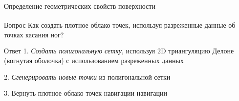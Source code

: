 \documentclass[aspectratio=169,xcolor=table]{beamer}
\begin{document}

\begin{frame}[t]{Определение геометрических свойств поверхности}
    \framesubtitle{}
    {\large\begin{block}{Вопрос}
        Как создать плотное облако точек, используя разреженные данные об точках касания ног?
        \end{block}}
    {\large\begin{alertblock}{Ответ}
1. \textit{Создать полигональную сетку}, используя 2D триангуляцию Делоне (вогнутая оболочка) с использованием разреженных данных

2. \textit{Сгенерировать новые точки} из полигональной сетки

3. Вернуть плотное облако точек навигации навигации
        \end{alertblock}}
\end{frame}
\end{document}
